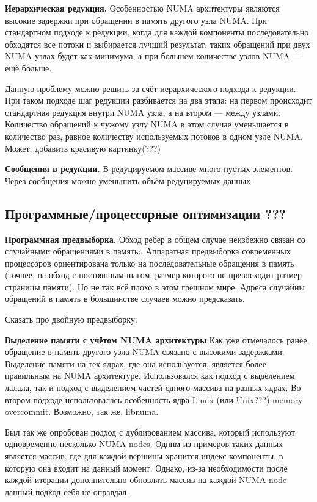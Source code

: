 \documentclass{article}
\begin{document}
\textbf{Иерархическая редукция.}
Особенностью NUMA архитектуры являются высокие задержки при обращении в память другого узла NUMA.
При стандартном подходе к редукции, когда для каждой компоненты последовательно обходятся все потоки и выбирается лучший результат, таких обращений при двух NUMA узлах будет как минимума, а при большем количестве узлов NUMA --- ещё больше.

Данную проблему можно решить за счёт иерархического подхода к редукции. При таком подходе шаг редукции разбивается на два этапа: на первом происходит стандартная редукция внутри NUMA узла, а на втором  --- между узлами. Количество обращений к чужому узлу NUMA в этом случае уменьшается в количество раз, равное количеству используемых потоков в одном узле NUMA.
Может, добавить красивую картинку(???)

\textbf{Сообщения в редукции.}
В редуцируемом массиве много пустых элементов. Через сообщения можно уменьшить объём редуцируемых данных.

\subsection{Программные/процессорные оптимизации ???}

\textbf{Программная предвыборка.}
Обход рёбер в общем случае неизбежно связан со случайными обращениями в память:.
Аппаратная предвыборка современных процессоров ориентирована только на последовательные обращения в память (точнее, на обход с постоянным шагом, размер которого не превосходит размер страницы памяти).
Но не так всё плохо в этом грешном мире. Адреса случайны обращений в память в большинстве случаев можно предсказать.

Сказать про двойную предвыборку.



\textbf{Выделение памяти с учётом NUMA архитектуры}
Как уже отмечалось ранее, обращение в память другого узла NUMA связано с высокими задержками. Выделение памяти на тех ядрах, где она используется, является более правильным на NUMA архитектуре. Использовался как подход с выделением лалала, так и подход с выделением частей одного массива на разных ядрах.
Во втором подходе использовалась особенность ядра Linux (или Unix???) memory overcommit. Возможно, так же, libnuma.

Был так же опробован подход с дублированием массива, который используют одновременно несколько NUMA nodes. Одним из примеров таких данных является массив, где для каждой вершины хранится индекс компоненты, в которую она входит на данный момент. Однако, из-за необходимости после каждой итерации дополнительно обновлять массив на каждой NUMA node данный подход себя не оправдал.
\end{document}
